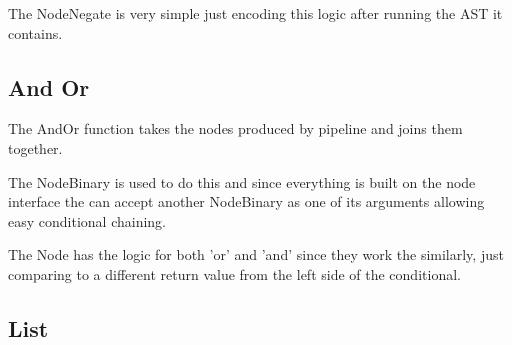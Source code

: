 The NodeNegate is very simple just encoding this logic after running the AST it contains.

\subsection{And Or}
The AndOr function takes the nodes produced by pipeline and joins them together.

The NodeBinary is used to do this and since everything is built on the node interface the can accept another NodeBinary as one of its arguments allowing easy conditional chaining.

The Node has the logic for both 'or' and 'and' since they work the similarly, just comparing to a different return value from the left side of the conditional.


\subsection{List}













